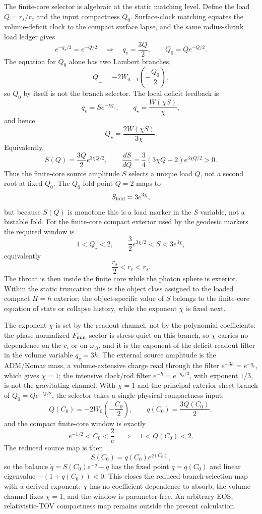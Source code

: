 \documentclass[12pt,a4paper]{article}
\begin{document}
The finite-core selector is algebraic at the static matching level.  Define the
load $Q=r_s/r_c$ and the input compactness $Q_0$.  Surface-clock matching
equates the volume-deficit clock to the compact surface lapse, and the same
radius-shrink load ledger gives
\[
e^{-q_v/3}=e^{-Q/2}\quad\Rightarrow\quad q_v=\frac{3Q}{2},\qquad
Q_0=Qe^{-Q/2}.
\]
The equation for $Q_0$ alone has two Lambert branches,
\[
Q_\pm=-2W_{0,-1}\!\left(-\frac{Q_0}{2}\right),
\]
so $Q_0$ by itself is not the branch selector.  The local deficit feedback is
\[
q_v=Se^{-\chi q_v},\qquad q_\star=\frac{W(\chi S)}{\chi},
\]
and hence
\[
Q_\star=\frac{2W(\chi S)}{3\chi}.
\]
Equivalently,
\[
S(Q)=\frac{3Q}{2}e^{3\chi Q/2},\qquad
\frac{dS}{dQ}=\frac34(3\chi Q+2)e^{3\chi Q/2}>0.
\]
Thus the finite-core source amplitude $S$ selects a unique load $Q$, not a
second root at fixed $Q_0$. The $Q_0$ fold point $Q=2$ maps to
\[
S_{\rm fold}=3e^{3\chi},
\]
but because $S(Q)$ is monotone this is a load marker in the $S$ variable, not a
bistable fold. For the finite-core compact exterior used by the geodesic markers
the required window is
\[
1<Q_\star<2,\qquad
\frac32 e^{3\chi/2}<S<3e^{3\chi},
\]
equivalently
\[
\frac{r_s}{2}<r_c<r_s.
\]
The throat is then inside the finite core while the photon sphere is exterior.
Within the static truncation this is the object class assigned to the loaded
compact $H=h$ exterior; the object-specific value of $S$ belongs to the
finite-core equation of state or collapse history, while the exponent $\chi$
is fixed next.

The exponent $\chi$ is set by the readout channel, not by the polynomial
coefficients: the phase-normalized $F_{\rm min}$ sector is stress-quiet on
this branch, so $\chi$ carries no dependence on the $c_i$ or on
$\omega_\Delta$, and it is the exponent of the deficit-readout filter in the
volume variable $q_v=3h$. The external source amplitude is the ADM/Komar
mass, a volume-extensive charge read through the filter $e^{-3h}=e^{-q_v}$,
which gives $\chi=1$; the intensive clock/rod filter $e^{-h}=e^{-q_v/3}$,
with exponent $1/3$, is not the gravitating channel. With $\chi=1$ and the
principal exterior-sheet branch of $Q_0=Qe^{-Q/2}$, the selector takes a
single physical compactness input:
\[
Q(C_0)=-2W_0\!\left(-\frac{C_0}{2}\right),\qquad
q(C_0)=\frac{3Q(C_0)}{2},
\]
and the compact finite-core window is exactly
\[
e^{-1/2}<C_0<\frac{2}{e}
\quad\Longrightarrow\quad
1<Q(C_0)<2.
\]
The reduced source map is then
\[
S(C_0)=q(C_0)e^{q(C_0)},
\]
so the balance $\dot q=S(C_0)e^{-q}-q$ has the fixed point
$q=q(C_0)$ and linear eigenvalue $-(1+q(C_0))<0$.  This closes the reduced
branch-selection map with a derived exponent: $\chi$ has no coefficient
dependence to absorb, the volume channel fixes $\chi=1$, and the window is
parameter-free.  An arbitrary-EOS, relativistic-TOV compactness map remains
outside the present calculation.
\end{document}
